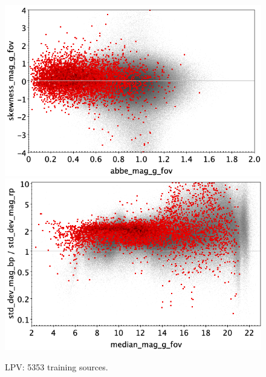 \documentclass[longauth]{aa}
\begin{document}
\begin{appendix}
\begin{figure}
\vspace{4mm}
 \includegraphics[width=0.45\hsize]{figures/appendix/LPV_trn_ask.png}  %
\hspace{2mm}
 \includegraphics[width=0.45\hsize]{figures/appendix/LPV_trn_msdr.png}  \\ %
\vspace{4mm}
 \caption{LPV: 5353 training sources.}  
 \label{fig:app:LPV_trn}
\end{figure}


\end{appendix}
\end{document}
